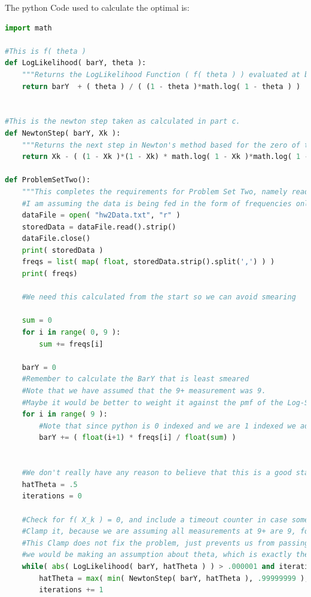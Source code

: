 \documentclass{paper}
\begin{document}
The python Code used to calculate the optimal is: 
\begin{lstlisting}[language=python]
import math

#This is f( theta ) 
def LogLikelihood( barY, theta ):
	"""Returns the LogLikelihood Function ( f( theta ) ) evaluated at barY and theta"""
	return barY  + ( theta ) / ( (1 - theta )*math.log( 1 - theta ) )


#This is the newton step taken as calculated in part c.
def NewtonStep( barY, Xk ):
	"""Returns the next step in Newton's method based for the zero of the logLikelihood function based on sample mean and Current step Xk"""
	return Xk - ( (1 - Xk )*(1 - Xk) * math.log( 1 - Xk )*math.log( 1 - Xk ) * barY + Xk*(1-Xk)*math.log( 1 - Xk) ) / ( Xk + math.log( 1 - Xk ) )
	
def ProblemSetTwo():
	"""This completes the requirements for Problem Set Two, namely reading a file containing realizations from a log series distribution and calculates the Maximum Likelihood Estimator"""
	#I am assuming the data is being fed in the form of frequencies only, comma seperated, beginning from 1 and going to 9+
	dataFile = open( "hw2Data.txt", "r" )
	storedData = dataFile.read().strip()
	dataFile.close()
	print( storedData )
	freqs = list( map( float, storedData.strip().split(',') ) )
	print( freqs)
	
	#We need this calculated from the start so we can avoid smearing
	
	sum = 0
	for i in range( 0, 9 ):
		sum += freqs[i]
	
	barY = 0
	#Remember to calculate the BarY that is least smeared
	#Note that we have assumed that the 9+ measurement was 9.
	#Maybe it would be better to weight it against the pmf of the Log-Series to get a weighted average of all the possibilities
	for i in range( 9 ):
		#Note that since python is 0 indexed and we are 1 indexed we add one to i
		barY += ( float(i+1) * freqs[i] / float(sum) )
		
	
	#We don't really have any reason to believe that this is a good starting position, however since we're dealing with a GLM problem, we should still converge quickly
	hatTheta = .5
	iterations = 0
	
	#Check for f( X_k ) = 0, and include a timeout counter in case something when wrong
	#Clamp it, because we are assuming all measurements at 9+ are 9, for high values of theta we will have problems with Newton's Method
	#This Clamp does not fix the problem, just prevents us from passing a negative number into log. This is a fault of us binning, and if we were to use a weighted average,
	#we would be making an assumption about theta, which is exactly the thing we are trying to estimate.
	while( abs( LogLikelihood( barY, hatTheta ) ) > .000001 and iterations < 10 ):
		hatTheta = max( min( NewtonStep( barY, hatTheta ), .99999999 ), 0.00000001 )
		iterations += 1
		

\end{lstlisting}
\end{document}
